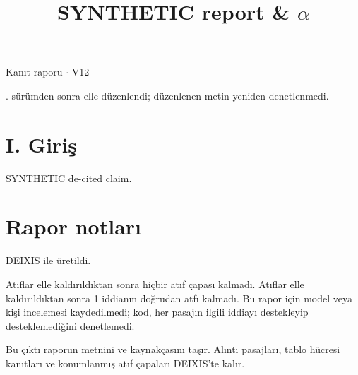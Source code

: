 \documentclass[journal]{IEEEtran}
\begin{document}
\renewcommand{\abstractname}{Özet}
\renewcommand{\IEEEkeywordsname}{Dizin Terimleri}
\renewcommand{\refname}{Kaynaklar}

\title{SYNTHETIC report \& \ensuremath{\alpha}}

\maketitle

\noindent Kanıt raporu \ensuremath{\cdot} V12

. sürümden sonra elle düzenlendi; düzenlenen metin yeniden denetlenmedi.

\section*{I. Giriş}

SYNTHETIC de-cited claim.

\section*{Rapor notları}

DEIXIS ile üretildi.

Atıflar elle kaldırıldıktan sonra hiçbir atıf çapası kalmadı. Atıflar elle kaldırıldıktan sonra 1 iddianın doğrudan atfı kalmadı. Bu rapor için model veya kişi incelemesi kaydedilmedi; kod, her pasajın ilgili iddiayı destekleyip desteklemediğini denetlemedi.

Bu çıktı raporun metnini ve kaynakçasını taşır. Alıntı pasajları, tablo hücresi kanıtları ve konumlanmış atıf çapaları DEIXIS'te kalır.
\end{document}
